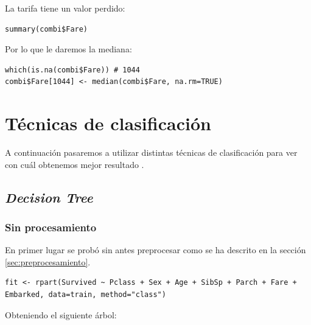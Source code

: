 La tarifa tiene un valor perdido:

\begin{lstlisting}[style=R]
summary(combi$Fare)
\end{lstlisting}

Por lo que le daremos la mediana:

\begin{lstlisting}[style=R]
which(is.na(combi$Fare)) # 1044
combi$Fare[1044] <- median(combi$Fare, na.rm=TRUE)
\end{lstlisting}

\section{Técnicas de clasificación}

A continuación pasaremos a utilizar distintas técnicas de clasificación para ver con cuál obtenemos mejor resultado \cite{TrevorStephensTutorial}.

\subsection{\textit{Decision Tree}}

\subsubsection{Sin procesamiento}

En primer lugar se probó sin antes preprocesar como se ha descrito en la sección \ref{sec:preprocesamiento}.

\begin{lstlisting}[style=R]
fit <- rpart(Survived ~ Pclass + Sex + Age + SibSp + Parch + Fare + Embarked, data=train, method="class")
\end{lstlisting}

Obteniendo el siguiente árbol:

